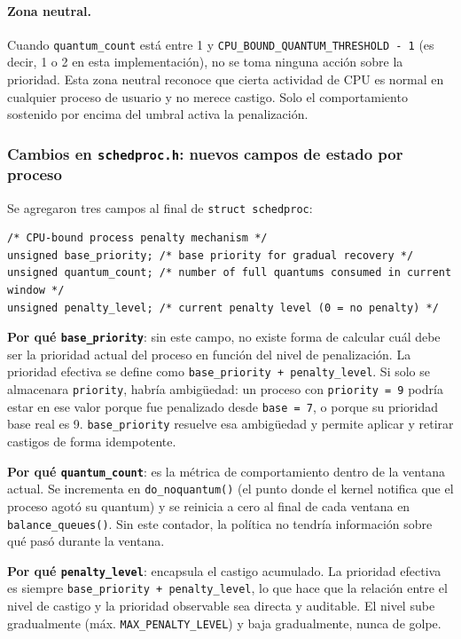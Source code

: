 \documentclass[11pt,a4paper]{article}
\begin{document}
\paragraph{Zona neutral.}
Cuando \texttt{quantum\_count} est\'a entre 1 y \texttt{CPU\_BOUND\_QUANTUM\_THRESHOLD - 1} (es decir, 1 o 2 en esta implementaci\'on), no se toma ninguna acci\'on sobre la prioridad. Esta zona neutral reconoce que cierta actividad de CPU es normal en cualquier proceso de usuario y no merece castigo. Solo el comportamiento sostenido por encima del umbral activa la penalizaci\'on.

\subsubsection*{Cambios en \texttt{schedproc.h}: nuevos campos de estado por proceso}

Se agregaron tres campos al final de \texttt{struct schedproc}:

\begin{lstlisting}[style=cstyle,caption={Campos agregados en \texttt{schedproc.h}}]
/* CPU-bound process penalty mechanism */
unsigned base_priority; /* base priority for gradual recovery */
unsigned quantum_count; /* number of full quantums consumed in current window */
unsigned penalty_level; /* current penalty level (0 = no penalty) */
\end{lstlisting}

\textbf{Por qu\'e \texttt{base\_priority}}: sin este campo, no existe forma de calcular cu\'al debe ser la prioridad actual del proceso en funci\'on del nivel de penalizaci\'on. La prioridad efectiva se define como \texttt{base\_priority + penalty\_level}. Si solo se almacenara \texttt{priority}, habr\'ia ambig\"uedad: un proceso con \texttt{priority = 9} podr\'ia estar en ese valor porque fue penalizado desde \texttt{base = 7}, o porque su prioridad base real es 9. \texttt{base\_priority} resuelve esa ambig\"uedad y permite aplicar y retirar castigos de forma idempotente.

\textbf{Por qu\'e \texttt{quantum\_count}}: es la m\'etrica de comportamiento dentro de la ventana actual. Se incrementa en \texttt{do\_noquantum()} (el punto donde el kernel notifica que el proceso agot\'o su quantum) y se reinicia a cero al final de cada ventana en \texttt{balance\_queues()}. Sin este contador, la pol\'itica no tendr\'ia informaci\'on sobre qu\'e pas\'o durante la ventana.

\textbf{Por qu\'e \texttt{penalty\_level}}: encapsula el castigo acumulado. La prioridad efectiva es siempre \texttt{base\_priority + penalty\_level}, lo que hace que la relaci\'on entre el nivel de castigo y la prioridad observable sea directa y auditable. El nivel sube gradualmente (m\'ax. \texttt{MAX\_PENALTY\_LEVEL}) y baja gradualmente, nunca de golpe.
\end{document}
